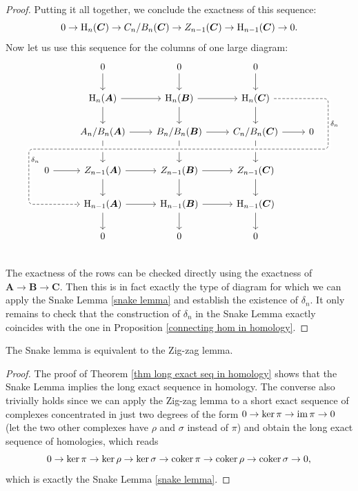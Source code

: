 \begin{proof}
    Putting it all together, we conclude the exactness of this sequence:
    \[0\to \mathrm{H}_n(\boldsymbol{C})\to C_n/B_n(\boldsymbol{C})\to Z_{n-1}(\boldsymbol{C})\to \mathrm{H}_{n-1}(\boldsymbol{C})\to 0.\]
    Now let us use this sequence for the columns of one large diagram:
    \[\begin{tikzcd}
        && 0\ar{d}& 0\ar{d} &0\ar{d} &&\\
        & & \rmH_n(\bm{A}) \ar{r} \ar{d} & \rmH_n(\bm{B})\ar{r} \ar{d} &  \rmH_n(\bm{C}) \ar{d}   %
        & & \\
        &  &  A_n/B_n(\bm{A}) \ar{r} & B_n/B_n(\bm{B}) \ar{r} \ar{dd} &  C_n/B_n(\bm{C})\ar{r}\ar{dd} & 0 &  ~\\[-10pt]
        & & &  ~ & & \ar[r, phantom, ""{coordinate, name=Y}] & ~\\[-10pt]
        ~&  \ar[l, phantom, ""{coordinate, name=Z}] 0 \ar{r} &  Z_{n-1}(\bm{A}) \ar[uu,leftarrow,crossing over]\ar{r} \ar{d} &  Z_{n-1}(\bm{B}) \ar{r} \ar{d} &  Z_{n-1}(\bm{C}) \ar{d} & &  \\
              & &  \ar[from=uuuurr, "\delta_n", dashed,crossing over, rounded corners,
                      to path=
                              { -- ([xshift=2ex]\tikztostart.east)
                              -| (Y) [near end]\tikztonodes
                              -| (Z) [near end]\tikztonodes
                              |- ([xshift=-2ex]\tikztotarget.west)
                               -- (\tikztotarget)}
                    ] \rmH_{n-1}(\bm{A})\ar{r}\ar{d}
               &  \rmH_{n-1}(\bm{B}) \ar{r}\ar{d}
               &  \rmH_{n-1}(\bm{C})\ar{d}
               & 
               & \\
        && 0& 0 &0 &&\\
    \end{tikzcd}\]
    The exactness of the rows can be checked directly using the exactness of $\bm{A}\to \bm{B}\to\bm{C}$. Then this is in fact exactly the type of diagram for which we can apply the Snake Lemma \ref{snake lemma} and establish the existence of $\delta_n$. It only remains to check that the construction of $\delta_n$ in the Snake Lemma exactly coincides with the one in Proposition \ref{connecting hom in homology}.
\end{proof}
\begin{cor}
    The Snake lemma is equivalent to the Zig-zag lemma.
\end{cor}
\begin{proof}
     The proof of Theorem \ref{thm long exact seq in homology} shows that the Snake Lemma implies the long exact sequence in homology. The converse also trivially holds since we can apply the Zig-zag lemma to a short exact sequence of complexes concentrated in just two degrees of the form $0\to \ker\pi \to \operatorname{im}\pi \to 0$ (let the two other complexes have $\rho $ and $\sigma$ instead of $\pi$) and obtain the long exact sequence of homologies, which reads
    \[0\to \ker\pi \to \ker\rho\to \ker\sigma\to \operatorname{coker}\pi\to \operatorname{coker}\rho\to\operatorname{coker}\sigma\to 0, \]
    which is exactly the Snake Lemma \ref{snake lemma}.
\end{proof}

